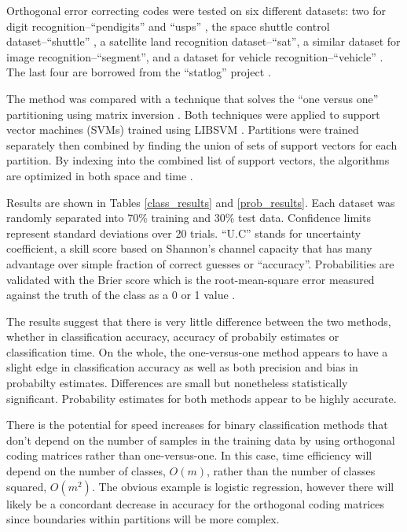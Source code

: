 Orthogonal error correcting codes were tested on six different datasets:
two for digit recognition--``pendigits'' \citep{Alimoglu1996} and
``usps'' \citep{Hull1994}, the space shuttle control dataset--``shuttle''
\citep{King_etal1995}, a satellite land recognition
dataset--``sat'', a similar dataset for image recognition--``segment'',
and a dataset for vehicle recognition--``vehicle'' \citep{Siebert1987}.
The last four are borrowed from the ``statlog'' project \citep{King_etal1995,Michie_etal1994}.

The method was compared with a technique that solves the ``one versus one'' 
partitioning using matrix inversion \citep{Wu_etal2004}.
Both techniques were applied to support vector machines (SVMs) trained using
LIBSVM \citep{Chang_Lin2011}.
Partitions were trained separately then combined by finding the union of
sets of support vectors for each partition.
By indexing into the combined list of support vectors, the algorithms are
optimized in both space and time \citep{Chang_Lin2011}.

Results are shown in Tables \ref{class_results} and \ref{prob_results}.
Each dataset was randomly separated into 70\% training and 30\%
test data.
Confidence limits represent standard deviations over 20 trials.
``U.C'' stands for uncertainty
coefficient, a skill score based on Shannon's channel capacity
\citep{Shannon,Press_etal1992,Mills2011} that has many advantage over simple
fraction of correct guesses or ``accuracy''.
Probabilities are validated with the Brier score 
which is the root-mean-square
error measured against the truth of the class as a 0 or 1 value
\citep{Brier1950,Jolliffe_Stephenson2003}.

The results suggest that there is very little difference between the two
methods, whether in classification accuracy, accuracy of probabily estimates
or classification time.
On the whole, the one-versus-one method appears to have a slight edge in
classification accuracy as well as both precision and bias in probabilty
estimates.
Differences are small but nonetheless statistically significant.
Probability estimates for both methods appear to be highly accurate.

There is the potential for speed increases for binary classification methods
that don't depend on the number of samples in the training data by using
orthogonal coding matrices rather than one-versus-one.
In this case, time efficiency will depend on the number of classes,
$O(m)$, rather than the number of classes squared, $O(m^2)$.
The obvious example is logistic regression, however there will likely be
a concordant decrease in accuracy for the orthogonal coding matrices since
boundaries within partitions will be more complex.


